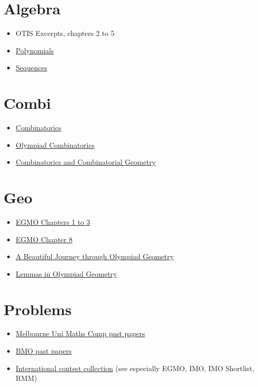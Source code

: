 \documentclass{amsart}
\begin{document}
\section{Algebra}
\begin{itemize}
  \item OTIS Excerpts, chapters 2 to 5
  \item
    \href{https://alexanderrem.weebly.com/uploads/7/2/5/6/72566533/polynomials.pdf}
    {Polynomials}
  \item
    \href{https://alexanderrem.weebly.com/uploads/7/2/5/6/72566533/sequences.pdf}
    {Sequences}
\end{itemize}

\section{Combi}
\begin{itemize}
  \item \href{http://math.sun.ac.za/swagner/Combinatorics.pdf}{Combinatorics}
  \item
    \href{https://drive.google.com/file/d/1sQtirXxkEfWYuGSKDZ-d7VGYkR_idebY/view}
    {Olympiad Combinatorics}
  \item
    \href{https://drive.google.com/file/d/1pkgUjWs4ArL9Huq712NO1RtuAvXjr3d9/view?usp=sharing}
    {Combinatorics and Combinatorial Geometry}
\end{itemize}

\section{Geo}
\begin{itemize}
  \item
    \href{https://books.google.com/books?id=47UaDAAAQBAJ&lpg=PP1&pg=PP1#v=onepage&q&f=false}
    {EGMO Chapters 1 to 3}
  \item
    \href{https://www.maa.org/sites/default/files/pdf/ebooks/pdf/EGMO_chapter8.pdf}
    {EGMO Chapter 8}
  \item \href{https://www.olympiadgeometry.com/the-book.html} {A Beautiful
      Journey through Olympiad Geometry}
  \item \href{https://yufeizhao.com/olympiad/geolemmas.pdf} {Lemmas in Olympiad
      Geometry}
\end{itemize}

\section{Problems}
\begin{itemize}
  \item \href{https://mathscomp.ms.unimelb.edu.au/past-papers/} {Melbourne Uni
      Maths Comp past papers}
  \item \href{https://www.bmoc.maths.org/home/bmolot.pdf} {BMO past papers}
  \item 
    \href{https://artofproblemsolving.com/community/c14_international_contests}
    {International contest collection}
    (see especially EGMO, IMO,  IMO Shortlist, RMM)
\end{itemize}
\end{document}
